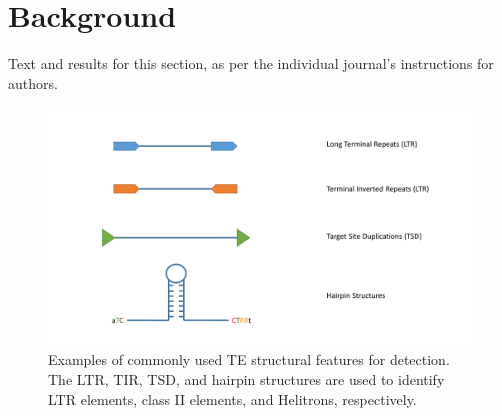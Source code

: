 \documentclass{bmcart}
\begin{document}


\section*{Background}
Text and results for this section, as per the individual journal's instructions for authors.

\begin{figure}[h!]
	\centerline{\includegraphics[width=1.0\textwidth]{figures/TEStructures.pdf}}
	\caption{Examples of commonly used TE structural features for detection. The LTR, TIR, TSD, and hairpin structures are used to identify LTR elements, class II elements, and Helitrons, respectively.}
	\label{fig:TE_structures}
\end{figure}
\end{document}
